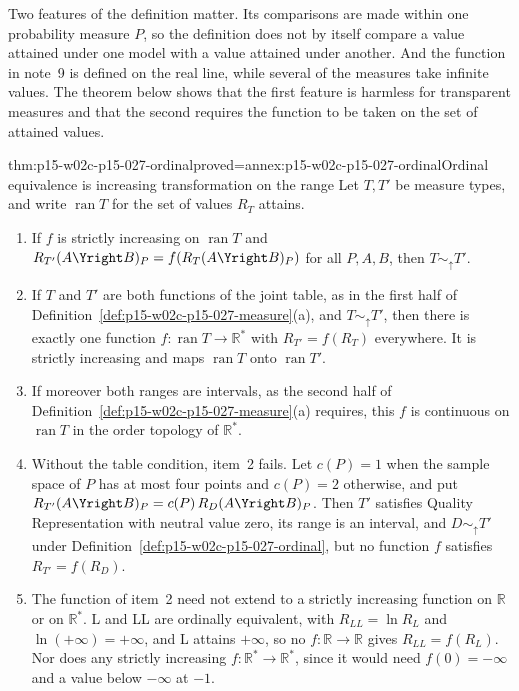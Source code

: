 Two features of the definition matter. Its comparisons are made within
one probability measure \(P\), so the definition does not by itself
compare a value attained under one model with a value attained under
another. And the function in note~9 is defined on the real line, while
several of the measures take infinite values. The theorem below shows
that the first feature is harmless for transparent measures and that the
second requires the function to be taken on the set of attained values.

\begin{hbtheorem}{thm:p15-w02c-p15-027-ordinal}{proved=annex:p15-w02c-p15-027-ordinal}{Ordinal equivalence is increasing transformation on the range}
Let \(T,T'\) be measure types, and write \(\operatorname{ran}T\) for
the set of values \(R_T\) attains.
\begin{enumerate}
\item If \(f\) is strictly increasing on \(\operatorname{ran}T\) and
  \(R_{T'}(A\Yright B)_P=f(R_T(A\Yright B)_P)\) for all \(P,A,B\), then
  \(T\sim_{\uparrow}T'\).
\item If \(T\) and \(T'\) are both functions of the joint table, as in
  the first half of Definition~\ref{def:p15-w02c-p15-027-measure}(a),
  and \(T\sim_{\uparrow}T'\), then there is exactly one function
  \(f:\operatorname{ran}T\to\mathbb R^*\) with
  \(R_{T'}=f(R_T)\) everywhere. It is strictly increasing and maps
  \(\operatorname{ran}T\) onto \(\operatorname{ran}T'\).
\item If moreover both ranges are intervals, as the second half of
  Definition~\ref{def:p15-w02c-p15-027-measure}(a) requires, this \(f\)
  is continuous on \(\operatorname{ran}T\) in the order topology of
  \(\mathbb R^*\).
\item Without the table condition, item~2 fails. Let \(c(P)=1\) when
  the sample space of \(P\) has at most four points and \(c(P)=2\)
  otherwise, and put \(R_{T'}(A\Yright B)_P=c(P)\,R_D(A\Yright B)_P\).
  Then \(T'\) satisfies Quality Representation with neutral value zero,
  its range is an interval, and \(D\sim_{\uparrow}T'\) under
  Definition~\ref{def:p15-w02c-p15-027-ordinal}, but no function \(f\)
  satisfies \(R_{T'}=f(R_D)\).
\item The function of item~2 need not extend to a strictly increasing
  function on \(\mathbb R\) or on \(\mathbb R^*\). L and LL are
  ordinally equivalent, with \(R_{LL}=\ln R_L\) and
  \(\ln(+\infty)=+\infty\), and L attains \(+\infty\), so no
  \(f:\mathbb R\to\mathbb R\) gives \(R_{LL}=f(R_L)\). Nor does any
  strictly increasing \(f:\mathbb R^*\to\mathbb R^*\), since it would
  need \(f(0)=-\infty\) and a value below \(-\infty\) at \(-1\).
\end{enumerate}
\end{hbtheorem}


